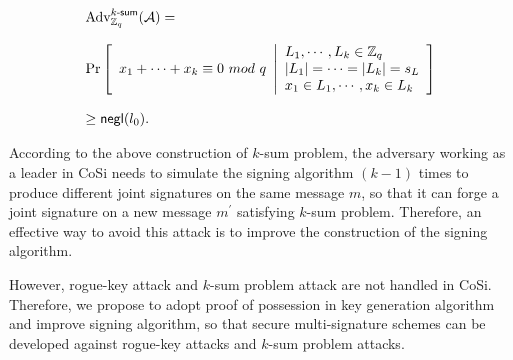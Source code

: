 \documentclass[journal]{IEEEtran}
\begin{document}


\begin{displaymath}
\begin{array}{l}
\textup{Adv}^{\textsf{\(k\)-sum}}_{\mathbb{Z}_q}({\mathcal{A}})=\\\\
\textup{Pr}
\left[
\begin{array}{l}
x_1+\cdots+x_k\equiv0\ mod\ q
\end{array}
\middle|
\begin{array}{l}
L_1,\cdots,L_k\in\mathbb{Z}_q\\
|L_1|=\cdots =|L_k|=s_L\\
x_1\in L_1,\cdots ,x_k\in L_k
\end{array}
\right]\\\\
\geq \textsf{negl} (l_0).
\end{array}
\end{displaymath}

According to the above construction of \(k\)-sum problem, the adversary working as a leader in CoSi needs to simulate the signing algorithm \((k-1)\) times to produce different joint signatures on the same message \(m\), so that it can forge a joint signature on a new message \(m^\prime\) satisfying \(k\)-sum problem. Therefore, an effective way to avoid this attack is to improve the construction of the signing algorithm.

However, rogue-key attack and \(k\)-sum problem attack are not handled in CoSi. Therefore, we propose to adopt proof of possession in key generation algorithm and improve signing algorithm, so that secure multi-signature schemes can be developed against rogue-key attacks and \(k\)-sum problem attacks.
\end{document}
